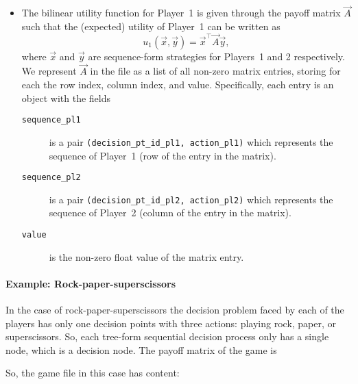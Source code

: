 \documentclass{homework}
\begin{document}
\begin{itemize}
\begin{remark}
    \end{remark}
    \item The bilinear utility function for Player~1 is given through the payoff matrix $\vec{A}$ such that the (expected) utility of Player~1 can be written as
    \[
        u_1(\vec{x}, \vec{y}) = \vec{x}^\top\!\!\vec{A}\vec{y},
    \]
    where $\vec{x}$ and $\vec{y}$ are sequence-form strategies for Players~1 and 2 respectively. We represent $\vec{A}$ in the file as a list of all non-zero matrix entries, storing for each the row index, column index, and value. Specifically, each entry is an object with the fields
    \begin{description}
        \item[\texttt{sequence\_pl1}] is a pair \verb|(decision_pt_id_pl1, action_pl1)| which represents the sequence of Player~1 (row of the entry in the matrix).
        \item[\texttt{sequence\_pl2}] is a pair \verb|(decision_pt_id_pl2, action_pl2)| which represents the sequence of Player~2 (column of the entry in the matrix).
        \item[\texttt{value}] is the non-zero float value of the matrix entry. 
    \end{description}
\end{itemize}

\paragraph{Example: Rock-paper-superscissors}

In the case of rock-paper-superscissors the decision problem faced by each of the players has only one decision points with three actions: playing rock, paper, or superscissors. So, each tree-form sequential decision process only has a single node, which is a decision node. The payoff matrix of the game is
\begin{center}
\end{center}
So, the game file in this case has content:
\end{document}
